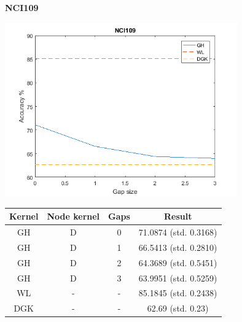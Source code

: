 \documentclass{article}
\begin{document}
\textbf{NCI109}\\
\begin{minipage}{0.6\linewidth}
	\hspace*{-1in}
	\includegraphics[width=10cm]{nci109} 
	\label{fig:nci109}
\end{minipage}
\begin{minipage}[c]{0.5\linewidth}
	
	\centering
	\begin{tabular}{c|c|c|c}
		Kernel & Node kernel & Gaps & Result\\
		\hline
		GH & D & 0 & 71.0874 (std. 0.3168)\\
		GH & D & 1 & 66.5413 (std. 0.2810)\\
		GH & D & 2 & 64.3689 (std. 0.5451)\\
		GH & D & 3 & 63.9951 (std. 0.5259)\\
		WL & - & - & 85.1845 (std. 0.2438)\\
		DGK & - & - & 62.69 (std. 0.23)
	\end{tabular}
	\label{table:nci109}
\end{minipage}
\end{document}
